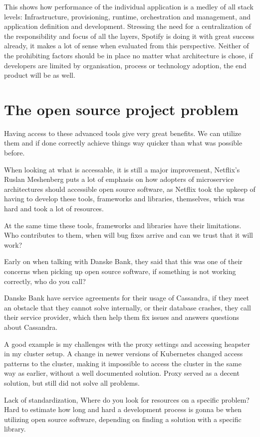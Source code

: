This shows how performance of the individual application is a medley of all stack levels: Infrastructure, provisioning, runtime, orchestration and management, and application definition and development. Stressing the need for a centralization of the responsibility and focus of all the layers, Spotify is doing it with great success already, it makes a lot of sense when evaluated from this perspective. Neither of the prohibiting factors should be in place no matter what architecture is chose, if developers are limited by organisation, process or technology adoption, the end product will be as well.


\section{The open source project problem}
Having access to these advanced tools give very great benefits. We can utilize them and if done correctly achieve things way quicker than what was possible before.

When looking at what is accessable, it is still a major improvement, Netflix's Ruslan Meshenberg\cite{meshenberg2016microservices} puts a lot of emphasis on how adopters of microservice architectures should accessible open source software, as Netflix took the upkeep of having to develop these tools, frameworks and libraries, themselves, which was hard and took a lot of resources.

At the same time these tools, frameworks and libraries have their limitations. Who contributes to them, when will bug fixes arrive and can we trust that it will work?

Early on when talking with Danske Bank, they said that this was one of their concerns when picking up open source software, if something is not working correctly, who do you call?

Danske Bank have service agreements for their usage of Cassandra, if they meet an obstacle that they cannot solve internally, or their database crashes, they call their service provider, which then help them fix issues and answers questions about Cassandra.

A good example is my challenges with the proxy settings and accessing heapster in my cluster setup. A change in newer versions of Kubernetes changed access patterns to the cluster, making it impossible to access the cluster in the same way as earlier, without a well documented solution. Proxy served as a decent solution, but still did not solve all problems.



Lack of standardization, Where do you look for resources on a specific problem? Hard to estimate how long and hard a development process is gonna be when utilizing open source software, depending on finding a solution with a specific library.